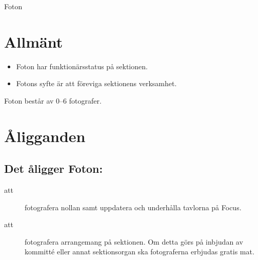 \documentclass[a4paper]{article}
\begin{document}
\renewcommand{\forening}{Foton} %

\begin{foreningenv}{\forening{}} %
    \section{Allmänt}
    \begin{itemize}
        \item Foton har funktionärsstatus på sektionen.
        \item Fotons syfte är att föreviga sektionens verksamhet.
    \end{itemize}
    Foton består av 0--6 fotografer.
    
    \section{Åligganden}
    \aliggsektfunkt{}
    
    \subsection{Det åligger Foton:}
    \begin{description}
        \item[att] fotografera nollan samt uppdatera och underhålla tavlorna på Focus.
        \item[att] fotografera arrangemang på sektionen. Om detta görs på inbjudan av kommitté eller annat sektionsorgan ska fotograferna erbjudas gratis mat.
    \end{description}
\end{foreningenv}
\end{document}
